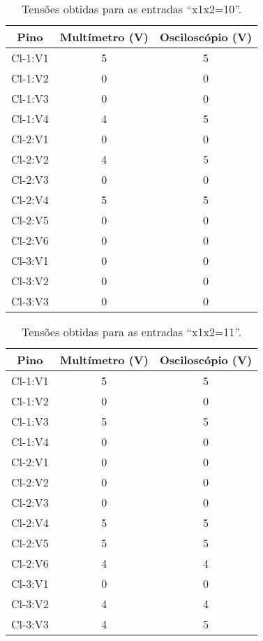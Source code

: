  	\begin{table}[H]
 		\centering
 		\caption{Tensões obtidas para as entradas “x1x2=10”.}
 		\label{table:tabelaVerdade12}
 		\begin{tabular}{c|c|c}
 			\textbf{Pino} & \textbf{Multímetro (V)} & \textbf{Osciloscópio (V)}\\
 			\hline
 			Cl-1:V1 & 5 & 5 \\
 			Cl-1:V2 & 0 & 0 \\
 			Cl-1:V3 & 0 & 0 \\
 			Cl-1:V4 & 4 & 5 \\
 			\hline
 			Cl-2:V1 & 0 & 0 \\
 			Cl-2:V2 & 4 & 5 \\
 			Cl-2:V3 & 0 & 0 \\
 			Cl-2:V4 & 5 & 5 \\
 			Cl-2:V5 & 0 & 0 \\
 			Cl-2:V6 & 0 & 0 \\
 			\hline
 			Cl-3:V1 & 0 & 0 \\
 			Cl-3:V2 & 0 & 0 \\
 			Cl-3:V3 & 0 & 0 \\
 		\end{tabular}
 	\end{table}

 	\begin{table}[H]
 		\centering
 		\caption{Tensões obtidas para as entradas “x1x2=11”.}
 		\label{table:tabelaVerdade13}
 		\begin{tabular}{c|c|c}
 			\textbf{Pino} & \textbf{Multímetro (V)} & \textbf{Osciloscópio (V)}\\
 			\hline
 			Cl-1:V1 & 5 & 5 \\
 			Cl-1:V2 & 0 & 0 \\
 			Cl-1:V3 & 5 & 5 \\
 			Cl-1:V4 & 0 & 0 \\
 			\hline
 			Cl-2:V1 & 0 & 0 \\
 			Cl-2:V2 & 0 & 0 \\
 			Cl-2:V3 & 0 & 0 \\
 			Cl-2:V4 & 5 & 5 \\
 			Cl-2:V5 & 5 & 5 \\
 			Cl-2:V6 & 4 & 4 \\
 			\hline
 			Cl-3:V1 & 0 & 0 \\
 			Cl-3:V2 & 4 & 4 \\
 			Cl-3:V3 & 4 & 5 \\
 		\end{tabular}
 	\end{table}

